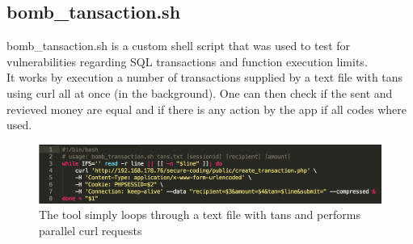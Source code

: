 \subsection{bomb\_tansaction.sh}
bomb\_tansaction.sh is a custom shell script that was used to test for vulnerabilities regarding SQL transactions and function execution limits.\\
It works by execution a number of transactions supplied by a text file with tans using curl all at once (in the background).
One can then check if the sent and revieved money are equal and if there is any action by the app if all codes where used.
\begin{figure}[ht]
	\centering
	\includegraphics[width=.8\linewidth]{figures/tool_bomb_transaction.png}
	\caption{The tool simply loops through a text file with tans and performs parallel curl requests}
	\label{fig:tool_bomb_transaction}
\end{figure}
